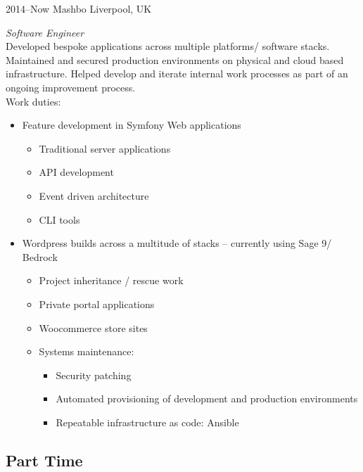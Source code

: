 \documentclass[]{friggeri-cv} %
\begin{document}
\begin{entrylist}


\entry
{2014--Now}
{Mashbo}
{Liverpool, UK}
{\emph{Software Engineer} \\
Developed bespoke applications across multiple platforms/ software stacks.  
Maintained and secured production environments on physical and cloud based infrastructure.
Helped develop and iterate internal work processes as part of an ongoing improvement process.\\
Work duties:
\begin{itemize}
\item Feature development in Symfony Web applications
\begin{itemize}
\item Traditional server applications
\item API development
\item Event driven architecture
\item CLI tools
\end{itemize}
\item Wordpress builds across a multitude of stacks -- currently using Sage 9/ Bedrock
\begin{itemize}
\item Project inheritance / rescue work
\item Private portal applications
\item Woocommerce store sites
\item Systems maintenance:
\begin{itemize}
\item Security patching
\item Automated provisioning of development and production environments
\item Repeatable infrastructure as code: Ansible
\end{itemize}
\end{itemize}
\end{itemize}}


\end{entrylist}

\subsection{Part Time}
\end{document}
